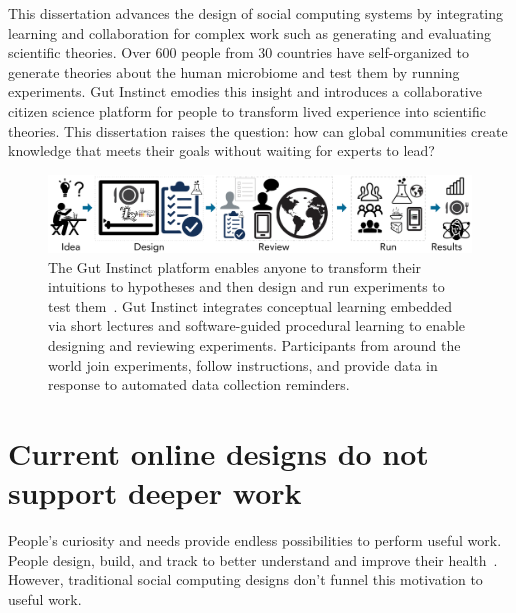 This dissertation advances the design of social computing systems by integrating learning and collaboration for complex work such as generating and evaluating scientific theories. Over 600 people from 30 countries have self-organized to generate theories about the human microbiome and test them by running experiments. Gut Instinct emodies this insight and introduces a collaborative citizen science platform for people to transform lived experience into scientific theories. This dissertation raises the question: how can global communities create knowledge that meets their goals without waiting for experts to lead?

\begin{figure}[b] 
  \centering
  \includegraphics[width=1.0\textwidth]{figures/intro/intro-1}
  \caption[The Gut Instinct platform enables anyone to transform their intuitions to hypotheses 
and then design and run experiments to test them]
{The Gut Instinct platform enables anyone to transform their intuitions to hypotheses 
and then design and run experiments to test them~\cite{Pandey, Pandey2017,Pandey2018}. Gut Instinct integrates 
conceptual learning embedded via short lectures and software-guided procedural 
learning to enable designing and reviewing experiments. Participants from around
 the world join experiments, follow instructions, and provide data in response to 
automated data collection reminders. }
  \label{fig:intro-1}
\end{figure}

\section {Current online designs do not support deeper work}
People’s curiosity and needs provide endless possibilities to perform useful work. People design, build, and track to better understand and improve their health~\cite{DanaLewis}. However, traditional social computing designs don’t funnel this motivation to useful work. 

